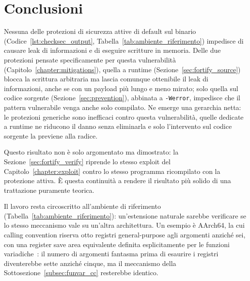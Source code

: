 \chapter*{Conclusioni} %

Nessuna delle protezioni di sicurezza attive di default sul binario (Codice~\ref{lst:checksec_output}, Tabella~\ref{tab:ambiente_riferimento}) impedisce di causare leak di informazioni e di eseguire scritture in memoria. Delle due protezioni pensate specificamente per questa vulnerabilità (Capitolo~\ref{chapter:mitigations}), quella a runtime (Sezione~\ref{sec:fortify_source}) blocca la scrittura arbitraria ma lascia comunque ottenibile il leak di informazioni, anche se con un payload più lungo e meno mirato; solo quella sul codice sorgente (Sezione~\ref{sec:prevention}), abbinata a \texttt{-Werror}, impedisce che il pattern vulnerabile venga anche solo compilato. Ne emerge una gerarchia netta: le protezioni generiche sono inefficaci contro questa vulnerabilità, quelle dedicate a runtime ne riducono il danno senza eliminarla e solo l'intervento sul codice sorgente la previene alla radice.

Questo risultato non è solo argomentato ma dimostrato: la Sezione~\ref{sec:fortify_verify} riprende lo stesso exploit del Capitolo~\ref{chapter:exploit} contro lo stesso programma ricompilato con la protezione attiva. È questa continuità a rendere il risultato più solido di una trattazione puramente teorica.

Il lavoro resta circoscritto all'ambiente di riferimento (Tabella~\ref{tab:ambiente_riferimento}): un'estensione naturale sarebbe verificare se lo stesso meccanismo vale su un'altra architettura. Un esempio è AArch64, la cui calling convention riserva otto registri general-purpose agli argomenti anziché sei, con una register save area equivalente definita esplicitamente per le funzioni variadiche~\cite{aapcs64}: il numero di argomenti fantasma prima di esaurire i registri diventerebbe sette anziché cinque, ma il meccanismo della Sottosezione~\ref{subsec:funvar_cc} resterebbe identico.
